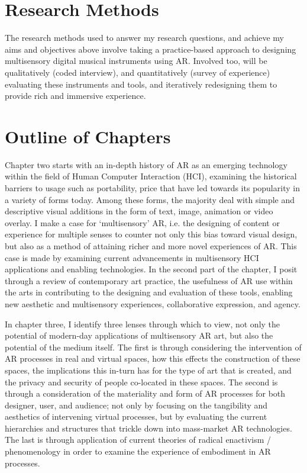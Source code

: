 \section{Research Methods}\label{sec: introduction-methods}
The research methods used to answer my research questions, and achieve my aims and objectives above involve taking a practice-based approach to designing multisensory digital musical instruments using AR. Involved too, will be qualitatively (coded interview), and quantitatively (survey of experience) evaluating these instruments and tools, and iteratively redesigning them to provide rich and immersive experience.



\section{Outline of Chapters}\label{sec: introduction-outline}
Chapter two starts with an in-depth history of AR as an emerging technology within the field of Human Computer Interaction (HCI), examining the historical barriers to usage such as portability, price that have led towards its popularity in a variety of forms today. Among these forms, the majority deal with simple and descriptive visual additions in the form of text, image, animation or video overlay. I make a case for `multisensory' AR, i.e. the designing of content or experience for multiple senses to counter not only this bias toward visual design, but also as a method of attaining richer and more novel experiences of AR. This case is made by examining current advancements in multisensory HCI applications and enabling technologies. In the second part of the chapter, I posit through a review of contemporary art practice, the usefulness of AR use within the arts in contributing to the designing and evaluation of these tools, enabling new aesthetic and multisensory experiences, collaborative expression, and agency.

In chapter three, I identify three lenses through which to view, not only the potential of modern-day applications of multisensory AR art, but also the potential of the medium itself. The first is through considering the intervention of AR processes in real and virtual spaces, how this effects the construction of these spaces, the implications this in-turn has for the type of art that is created, and the privacy and security of people co-located in these spaces. The second is through a consideration of the materiality and form of AR processes for both designer, user, and audience; not only by focusing on the tangibility and aesthetics of intervening virtual processes, but by evaluating the current hierarchies and structures that trickle down into mass-market AR technologies. The last is through application of current theories of radical enactivism / phenomenology in order to examine the experience of embodiment in AR processes.

